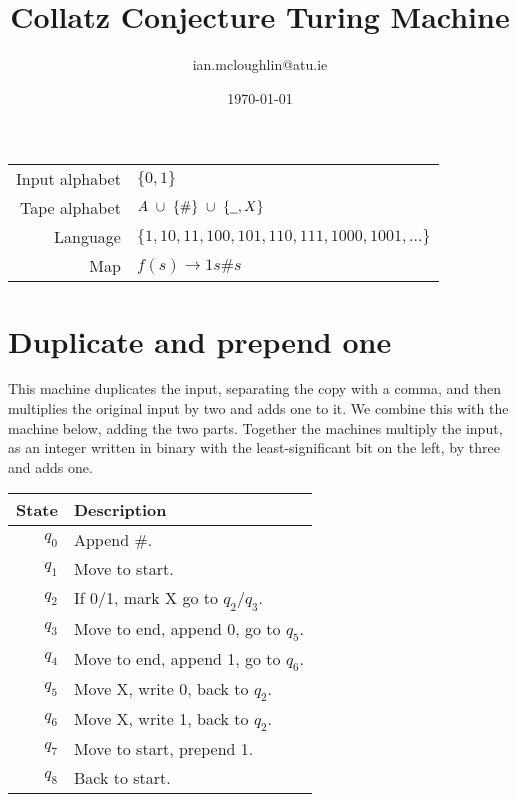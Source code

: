 \documentclass{iansnotes}
\title{Collatz Conjecture Turing Machine}
\author{ian.mcloughlin@atu.ie}
\date{\today}
\begin{document}
\maketitle

\begin{tabular}{rl}
  Input alphabet & $\{ 0, 1 \}$ \\
  Tape alphabet  & $A \ \cup \ \{ \# \} \ \cup \  \{ \underline{\hspace{2mm}},  X \}$ \\
  Language       & $\{1, 10, 11, 100, 101, 110, 111, 1000, 1001, \ldots \}$ \\
  Map            & $f(s) \rightarrow 1s\#s$ \\
\end{tabular}

\section{Duplicate and prepend one}
This machine duplicates the input, separating the copy with a comma, and then multiplies the original input by two and adds one to it.
We combine this with the machine below, adding the two parts.
Together the machines multiply the input, as an integer written in binary with the least-significant bit on the left, by three and adds one.

\begin{table}
  \begin{tabular}{rl}
    State & Description \\
    \midrule
    \( q_0 \) & Append $\#$. \\
    \( q_1 \) & Move to start. \\
    \( q_2 \) & If 0/1, mark X go to $q_2/q_3$. \\
    \( q_3 \) & Move to end, append 0, go to $q_5$. \\
    \( q_4 \) & Move to end, append 1, go to $q_6$. \\
    \( q_5 \) & Move X, write 0, back to \(q_2\). \\
    \( q_6 \) & Move X, write 1, back to \(q_2\). \\
    \( q_7 \) & Move to start, prepend 1. \\
    \( q_8 \) & Back to start. \\
  \end{tabular}
\end{table}
\end{document}
